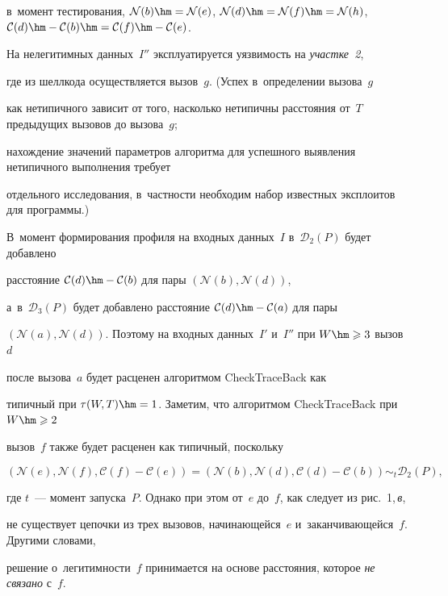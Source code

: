 в~момент тестирования, $\mathcal{N}(b)\hm=\mathcal{N}(e)$, $\mathcal{N}(d)\hm=\mathcal{N}(f)

\hm=\mathcal{N}(h)$, $\mathcal{C}(d)\hm-\mathcal{C}(b)\hm=\mathcal{C}(f)\hm-\mathcal{C}(e)$. 

На нелегитимных данных~$I''$ эксплуатируется уязвимость на \textit{участке~2}, 

где из шелл\-ко\-да осуществляется вызов~$g$. (Успех в~определении вызова~$g$ 

как нетипичного зависит от того, насколько нетипичны рас\-сто\-яния от~$T$ предыду\-щих вызовов до вызова~$g$; 

нахождение значений па\-ра\-мет\-ров алгоритма для успешного вы\-яв\-ле\-ния нетипичного выполнения требует 

отдельного исследования, в~част\-ности необходим набор известных эксплоитов для программы.)

В~момент формирования профиля на входных данных~$I$ в~$\mathcal{D}_2(P)$ будет добавлено 

расстояние $\mathcal{C}(d)\hm-\mathcal{C}(b)$ для пары $(\mathcal{N}(b),\mathcal{N}(d))$, 

а~в~$\mathcal{D}_3(P)$ будет добавлено рас\-сто\-яние $\mathcal{C}(d)\hm-\mathcal{C}(a)$ для пары

 $(\mathcal{N}(a),\mathcal{N}(d))$. Поэтому на входных данных~$I'$ и~$I''$ при $W\hm\geqslant 3$ вызов~$d$ 

 после вызова~$a$ будет расценен алгоритмом \textsf{CheckTraceBack} как 

 типичный при $\tau(W,T)\hm=1$. Заметим, что алгоритмом  \textsf{CheckTraceBack} при $W\hm\geqslant 2$ 

 вызов~$f$ также будет расценен как типичный, поскольку

$$

\left(\mathcal{N}(e),\mathcal{N}(f),\mathcal{C}(f)-\mathcal{C}(e)\right)=

\left(\mathcal{N}(b),\mathcal{N}(d),\mathcal{C}(d)-\mathcal{C}(b)\right)\sim_t \mathcal{D}_2(P),

$$

где $t$~--- момент запуска~$P$. Однако при этом от~$e$ до~$f$, как следует из рис.~1,\,\textit{в}, 

не существует цепочки из трех вызовов, начинающейся~$e$ и~за\-кан\-чи\-ва\-ющей\-ся~$f$. Другими словами, 

решение о~ле\-ги\-тим\-ности~$f$ принимается на основе рас\-сто\-яния, которое \textit{не связано} с~$f$. 

